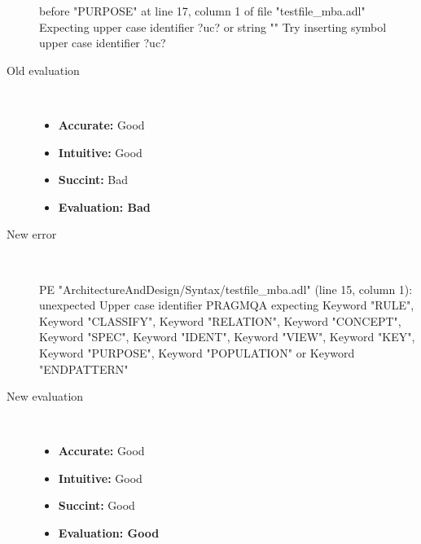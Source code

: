 \begin{description}
\begin{haskell}
before "PURPOSE" at line 17, column 1 of file "testfile_mba.adl"
Expecting upper case identifier ?uc? or string ""
Try inserting symbol upper case identifier ?uc?\end{haskell}
  \item[Old evaluation]~\\
    \begin{itemize}
    \item \textbf{Accurate:} Good
    \item \textbf{Intuitive:} Good
    \item \textbf{Succint:} Bad
    \item \textbf{Evaluation: Bad}
    \end{itemize}
  \item[New error]~\\
\begin{haskell}
PE "ArchitectureAndDesign/Syntax/testfile_mba.adl" (line 15, column 1):
unexpected Upper case identifier PRAGMQA
expecting Keyword "RULE", Keyword "CLASSIFY", Keyword "RELATION", Keyword "CONCEPT", Keyword "SPEC", Keyword "IDENT", Keyword "VIEW", Keyword "KEY", Keyword "PURPOSE", Keyword "POPULATION" or Keyword "ENDPATTERN"\end{haskell}
  \item[New evaluation]~\\
    \begin{itemize}
    \item \textbf{Accurate:} Good
    \item \textbf{Intuitive:} Good
    \item \textbf{Succint:} Good
    \item \textbf{Evaluation: Good
}
    \end{itemize}
  \end{description}

\hrulefill

